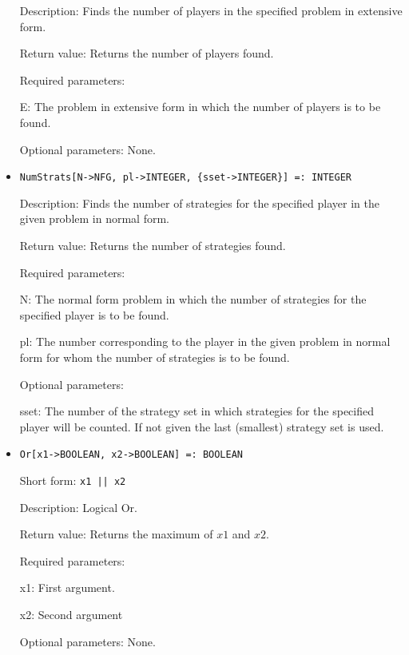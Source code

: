 \begin{itemize}
\bd
\item
[Description:] Finds the number of players in the specified problem in
extensive form.
\item
[Return value:] Returns the number of players found.
\item
[Required parameters:]\hfil\null

\bd
\item
[E:] The problem in extensive form in which the number of players is
to be found.
\ed

\item   
[Optional parameters:] None.
\ed

\item
\protect \large \begin{verbatim}
NumStrats[N->NFG, pl->INTEGER, {sset->INTEGER}] =: INTEGER
\end{verbatim}\normalsize

\bd

\item
[Description:] Finds the number of strategies for the specified player
in the given problem in normal form.
\item
[Return value:] Returns the number of strategies found.
\item
[Required parameters:]\hfil\null

\bd
\item
[N:] The normal form problem in which the number of strategies for the
specified player is to be found.
\item
[pl:] The number corresponding to the player in the given problem in
normal form for whom the number of strategies is to be found.
\ed

\item
[Optional parameters:]\hfil\null
	
\bd
\item  
[sset:] The number of the strategy set in which strategies for the
specified player will be counted.  If not given the last (smallest)
strategy set is used.

\ed
\ed

\item 
\protect \large \begin{verbatim}
Or[x1->BOOLEAN, x2->BOOLEAN] =: BOOLEAN
\end{verbatim} \normalsize
  
\bd
\item
[Short form:] \verb+x1 || x2+
\item
[Description:] Logical Or.
\item
[Return value:] Returns the maximum of $x1$ and $x2.$  
\item
[Required parameters:]\hfil\null
\bd
\item
[x1:] First argument.  
\item
[x2:] Second argument
\ed
\item
[Optional parameters:] None.
\ed




\end{itemize}
